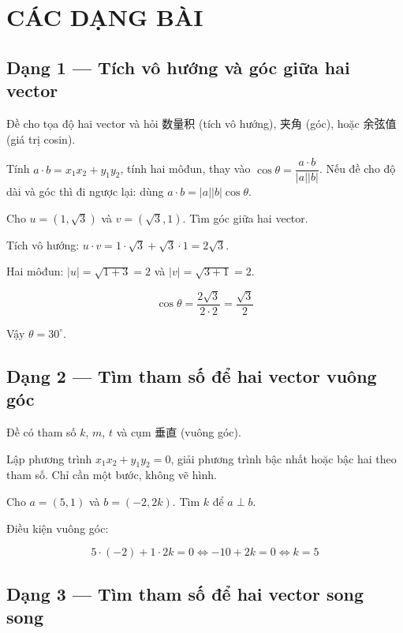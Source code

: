 \documentclass[11pt, a4paper]{article}
\begin{document}
\section{CÁC DẠNG BÀI}

\subsection{Dạng 1 — Tích vô hướng và góc giữa hai vector}

 Đề cho tọa độ hai vector và hỏi 数量积 (tích vô hướng), 夹角 (góc), hoặc 余弦值 (giá trị cosin).

 Tính $a \cdot b = x_1x_2 + y_1y_2$, tính hai môđun, thay vào $\cos\theta = \dfrac{a \cdot b}{\lvert a \rvert \lvert b \rvert}$. Nếu đề cho độ dài và góc thì đi ngược lại: dùng $a \cdot b = \lvert a \rvert \lvert b \rvert \cos\theta$.

\begin{vidu}[{1}]
Cho $u = (1, \sqrt{3})$ và $v = (\sqrt{3}, 1)$. Tìm góc giữa hai vector.

Tích vô hướng: $u \cdot v = 1 \cdot \sqrt{3} + \sqrt{3} \cdot 1 = 2\sqrt{3}$.

Hai môđun: $\lvert u \rvert = \sqrt{1 + 3} = 2$ và $\lvert v \rvert = \sqrt{3 + 1} = 2$.

$$\cos\theta = \frac{2\sqrt{3}}{2 \cdot 2} = \frac{\sqrt{3}}{2}$$

Vậy $\theta = 30^\circ$.

\end{vidu}
\subsection{Dạng 2 — Tìm tham số để hai vector vuông góc}

 Đề có tham số $k$, $m$, $t$ và cụm 垂直 (vuông góc).

 Lập phương trình $x_1x_2 + y_1y_2 = 0$, giải phương trình bậc nhất hoặc bậc hai theo tham số. Chỉ cần một bước, không vẽ hình.

\begin{vidu}[{2}]
Cho $a = (5, 1)$ và $b = (-2, 2k)$. Tìm $k$ để $a \perp b$.

Điều kiện vuông góc:

$$5 \cdot (-2) + 1 \cdot 2k = 0 \iff -10 + 2k = 0 \iff k = 5$$

\end{vidu}
\subsection{Dạng 3 — Tìm tham số để hai vector song song}
\end{document}
